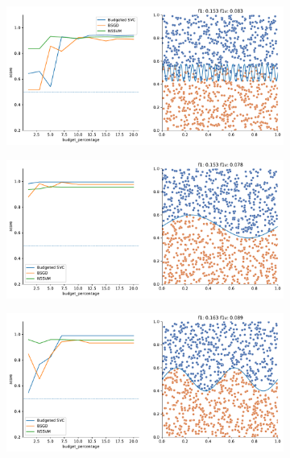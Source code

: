 \begin{figure}
    \begin{subfigure}{.5\textwidth}
        \centering
        \includegraphics[width=\textwidth]{img/comp_new/9.pdf}
    \end{subfigure}%
    \begin{subfigure}{.5\textwidth}
        \centering
        \includegraphics[width=\textwidth]{img/comp_new/10.pdf}
    \end{subfigure}
    \hfill
    \begin{subfigure}{.5\textwidth}
        \centering
        \includegraphics[width=\textwidth]{img/comp_new/11.pdf}

\end{subfigure}
\end{figure}
